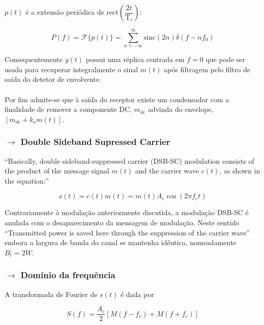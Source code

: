\noindent $p(t)$ é a extensão periódica de $\text{rect}\left(\dfrac{2t}{\text{T}_c}\right)$:

$$
    \boxed{P(f) = \mathcal{F}\{p(t)\} = \sum_{n=-\infty}^{\infty} \text{sinc}(2n)\delta(f - nf_0)}
$$

\noindent Consequentemente $y(t)$ possui uma réplica centrada em $f = 0$ que pode ser usada para recuperar integralmente o sinal $m(t)$ após filtragem pelo filtro de saída do detetor de envolvente.
\\\\
\noindent Por fim admite-se que à sa\'ida do receptor existe um condensador com a finalidade de remover a componente DC, $m_{dc}$ advinda do envelope, $[m_{dc} + k_a m(t)]$.

\subsubsection[2.1.3 Double Sideband Supressed Carrier]{$\rightarrow$ Double Sideband Supressed Carrier}
\label{subsubsec:DSB-SC}

``Basically, double sideband-suppressed carrier (DSB-SC) modulation consists of the product of the message signal $m(t)$ and the carrier wave $c(t)$, as shown in the equation:''\cite{Haykin2007}

$$
    \boxed{s(t) = c(t) m(t) = m(t) A_c \cos{(2\pi f_c t)}}
$$

\noindent Contrariamente à modulação anteriormente discutida, a modulação DSB-SC é anulada com o desaparecimento da mensagem de modulação. Neste sentido ``Transmitted power is saved here through the suppression of the carrier wave''\cite{Haykin2007} embora a largura de banda do canal se mantenha idêntica, nomeadamente $B_t = 2W$.
\subsubsection*{$\rightarrow$ Domínio da frequência}
\label{subsubsec:AM-freq-domain DSB-SC}

A transformada de Fourier de $s(t)$ é dada por

$$
    \boxed{S(f) = \frac{A_c}{2}\left[M(f - f_c) + M(f + f_c)\right]}
$$

